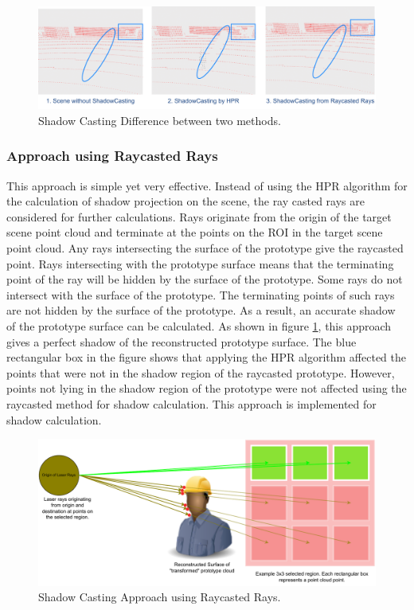 \begin{figure}[htbp]
    \centering
    \includegraphics[width=0.9\linewidth]{97_graphics/concepts/shadow_casting_difference.pdf}
    \caption{Shadow Casting Difference between two methods.}
    \label{fig:concept-shadow_casting_difference}
\end{figure}


\subsubsection{Approach using Raycasted Rays}
This approach is simple yet very effective. Instead of using the HPR algorithm for the calculation of shadow projection on the scene, the ray casted rays are considered for further calculations. Rays originate from the origin of the target scene point cloud and terminate at the points on the ROI in the target scene point cloud. Any rays intersecting the surface of the prototype give the raycasted point. Rays intersecting with the prototype surface means that the terminating point of the ray will be hidden by the surface of the prototype. Some rays do not intersect with the surface of the prototype. The terminating points of such rays are not hidden by the surface of the prototype. As a result, an accurate shadow of the prototype surface can be calculated. As shown in figure \ref{fig:concept-shadow_casting_difference}, this approach gives a perfect shadow of the reconstructed prototype surface. The blue rectangular box in the figure shows that applying the HPR algorithm affected the points that were not in the shadow region of the raycasted prototype. However, points not lying in the shadow region of the prototype were not affected using the raycasted method for shadow calculation. This approach is implemented for shadow calculation.
\begin{figure}[htbp]
    \centering
    \includegraphics[width=0.9\linewidth]{97_graphics/concepts/shadow_casting_by_raycast_method.pdf}
    \caption{Shadow Casting Approach using Raycasted Rays.}
    \label{fig:concept-shadow_casting_by_raycast_method}
\end{figure}

